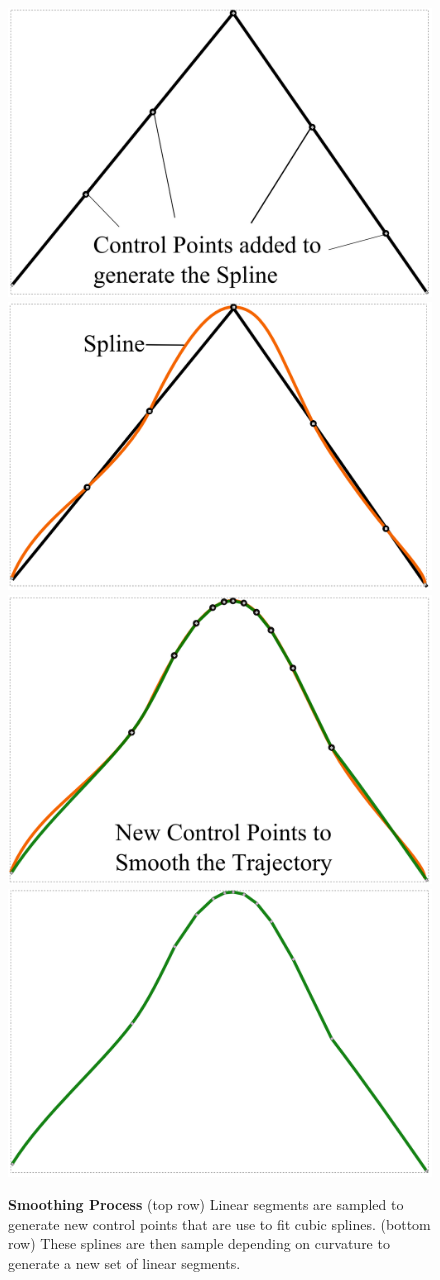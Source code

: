 \begin{figure}[t]
	\begin{center}
	\includegraphics[width=0.48\linewidth]{./images/Smooth1.png}
	\includegraphics[width=0.48\linewidth]{./images/Smooth2.png}\\
	\includegraphics[width=0.48\linewidth]{./images/Smooth3.png}
	\includegraphics[width=0.48\linewidth]{./images/Smooth4.png}
	\caption{
		\textbf{Smoothing Process} (top row) Linear segments are sampled to generate new control points that are use to fit cubic splines.
		(bottom row) These splines are then sample depending on curvature to generate a new set of linear segments.
	}
	\label{fig:smoothing}
	\end{center}
\end{figure}

